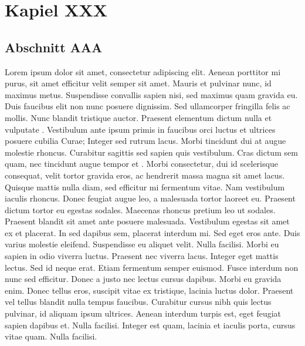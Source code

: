 
\chapter{Kapiel XXX}

\section{Abschnitt AAA}

Lorem ipsum dolor sit amet, consectetur adipiscing elit. Aenean porttitor mi purus, sit amet efficitur velit semper sit amet. Mauris et pulvinar nunc, id maximus metus. Suspendisse convallis sapien nisi, sed maximus quam gravida eu. Duis faucibus elit non nunc posuere dignissim. Sed ullamcorper fringilla felis ac mollis. Nunc blandit tristique auctor. Praesent elementum dictum nulla et vulputate \cite{paper0}. Vestibulum ante ipsum primis in faucibus orci luctus et ultrices posuere cubilia Curae; Integer sed rutrum lacus. Morbi tincidunt dui at augue molestie rhoncus. Curabitur sagittis sed sapien quis vestibulum. Cras dictum sem quam, nec tincidunt augue tempor et \cite{kauffels}. Morbi consectetur, dui id scelerisque consequat, velit tortor gravida eros, ac hendrerit massa magna sit amet lacus. Quisque mattis nulla diam, sed efficitur mi fermentum vitae. Nam vestibulum iaculis rhoncus.\newpar
Donec feugiat augue leo, a malesuada tortor laoreet eu. Praesent dictum tortor eu egestas sodales. Maecenas rhoncus pretium leo ut sodales. Praesent blandit sit amet ante posuere malesuada. Vestibulum egestas sit amet ex et placerat. In sed dapibus sem, placerat interdum mi. Sed eget eros ante. Duis varius molestie eleifend. Suspendisse eu aliquet velit. Nulla facilisi. Morbi eu sapien in odio viverra luctus.\newpar
Praesent nec viverra lacus. Integer eget mattis lectus. Sed id neque erat. Etiam fermentum semper euismod. Fusce interdum non nunc sed efficitur. Donec a justo nec lectus cursus dapibus. Morbi eu gravida enim. Donec tellus eros, suscipit vitae ex tristique, lacinia luctus dolor. Praesent vel tellus blandit nulla tempus faucibus. Curabitur cursus nibh quis lectus pulvinar, id aliquam ipsum ultrices. Aenean interdum turpis est, eget feugiat sapien dapibus et. Nulla facilisi. Integer est quam, lacinia et iaculis porta, cursus vitae quam. Nulla facilisi.

